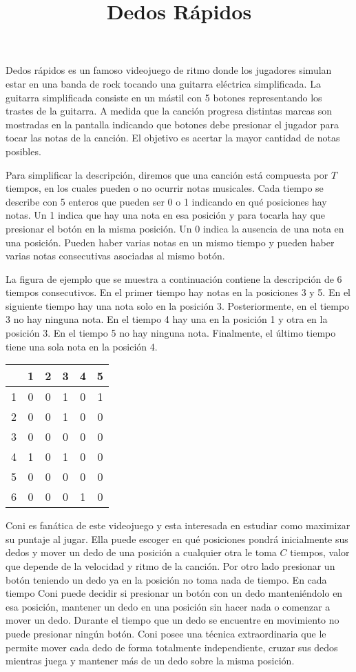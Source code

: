 \documentclass{oci}
\title{Dedos Rápidos}
\begin{document}
\begin{problemDescription}
  Dedos rápidos es un famoso videojuego de ritmo donde los jugadores simulan
  estar en una banda de rock tocando una guitarra eléctrica simplificada.
  La guitarra simplificada consiste en un mástil con 5 botones representando los
  trastes de la guitarra.
  A medida que la canción progresa distintas marcas son mostradas en la pantalla
  indicando que botones debe presionar el jugador para tocar las notas de la canción.
  El objetivo es acertar la mayor cantidad de notas posibles.

  Para simplificar la descripción, diremos que una canción está compuesta por $T$
  tiempos, en los cuales pueden o no ocurrir notas musicales.
  Cada tiempo se describe con 5 enteros que pueden ser 0 o 1 indicando en qué
  posiciones hay notas.
  Un 1 indica que hay una nota en esa posición y para tocarla hay que presionar
  el botón en la misma posición.
  Un 0 indica la ausencia de una nota en una posición.
  Pueden haber varias notas en un mismo tiempo y pueden haber varias
  notas consecutivas asociadas al mismo botón.

  La figura de ejemplo que se muestra a continuación contiene la descripción de
  6 tiempos consecutivos.
  En el primer tiempo hay notas en la posiciones 3 y 5.
  En el siguiente tiempo hay una nota solo en la posición 3.
  Posteriormente, en el tiempo 3 no hay ninguna nota.
  En el tiempo 4 hay una en la posición 1 y otra en la posición 3.
  En el tiempo 5 no hay ninguna nota.
  Finalmente, el último tiempo tiene una sola nota en la posición 4.

  \begin{center}
    \begin{tabular}{r|ccccc}
        & 1 & 2 & 3 & 4 & 5 \\
      \hline
      1 & 0 & 0 & 1 & 0 & 1 \\
      2 & 0 & 0 & 1 & 0 & 0 \\
      3 & 0 & 0 & 0 & 0 & 0 \\
      4 & 1 & 0 & 1 & 0 & 0 \\
      5 & 0 & 0 & 0 & 0 & 0 \\
      6 & 0 & 0 & 0 & 1 & 0 \\
    \end{tabular}
  \end{center}

  Coni es fanática de este videojuego y esta interesada en estudiar como
  maximizar su puntaje al jugar.
  Ella puede escoger en qué posiciones pondrá inicialmente sus dedos y mover un
  dedo de una posición a cualquier otra le toma $C$ tiempos, valor que depende
  de la velocidad y ritmo de la canción.
  Por otro lado presionar un botón teniendo un dedo ya en la posición no toma
  nada de tiempo.
  En cada tiempo Coni puede decidir si presionar un botón con un dedo
  manteniéndolo en esa posición, mantener un dedo en una posición sin hacer nada
  o comenzar a mover un dedo.
  Durante el tiempo que un dedo se encuentre en movimiento no puede presionar
  ningún botón.
  Coni posee una técnica extraordinaria que le permite mover cada dedo
  de forma totalmente independiente, cruzar sus dedos mientras juega y mantener
  más de un dedo sobre la misma posición.


\end{problemDescription}
\end{document}

